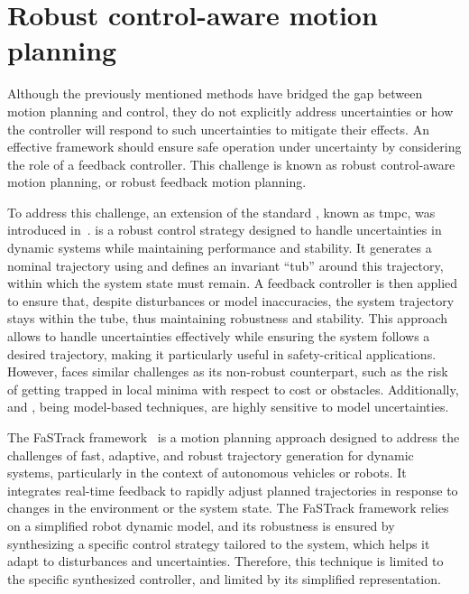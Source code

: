 \section{Robust control-aware motion planning}

Although the previously mentioned methods have bridged the gap between motion planning and control, they do not explicitly address uncertainties or how the controller will respond to such uncertainties to mitigate their effects.
An effective framework should ensure safe operation under uncertainty by considering the role of a feedback controller. 
This challenge is known as robust control-aware motion planning, or robust feedback motion planning.

To address this challenge, an extension of the standard , known as \gls{tmpc}, was introduced in~\cite{cTMPC}.
 is a robust control strategy designed to handle uncertainties in dynamic systems while maintaining performance and stability. 
It generates a nominal trajectory using  and defines an invariant ``tub'' around this trajectory, within which the system state must remain. 
A feedback controller is then applied to ensure that, despite disturbances or model inaccuracies, the system trajectory stays within the tube, thus maintaining robustness and stability. 
This approach allows  to handle uncertainties effectively while ensuring the system follows a desired trajectory, making it particularly useful in safety-critical applications.
However,  faces similar challenges as its non-robust counterpart, such as the risk of getting trapped in local minima with respect to cost or obstacles.
Additionally,  and , being model-based techniques, are highly sensitive to model uncertainties.

The FaSTrack framework~\cite{cFaSTrack} is a motion planning approach designed to address the challenges of fast, adaptive, and robust trajectory generation for dynamic systems, particularly in the context of autonomous vehicles or robots. 
It integrates real-time feedback to rapidly adjust planned trajectories in response to changes in the environment or the system state. 
The FaSTrack framework relies on a simplified robot dynamic model, and its robustness is ensured by synthesizing a specific control strategy tailored to the system, which helps it adapt to disturbances and uncertainties.
Therefore, this technique is limited to the specific synthesized controller, and limited by its simplified representation.

